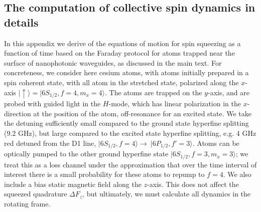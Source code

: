 \documentclass[preprint,aps,pra,onecolumn,superscriptaddress]{revtex4-1} %
\def\ket#1{\lvert{#1}\rangle}%
\begin{document}


\begin{appendix}
\section{The computation of collective spin dynamics in details}\label{Sec::opticalpumpinginrotatingframe}
In this appendix we derive of the equations of motion for spin squeezing as a function of time based on the Faraday protocol for atoms trapped near the surface of nanophotonic waveguides, as discussed in the main text.  For concreteness, we consider here cesium atoms, with atoms initially prepared in a spin coherent state, with all atom in the stretched state, polarized along the $x$-axis $\ket{\uparrow} = \ket{6S_{1/2}, f=4, m_x=4}$.  The atoms are trapped on the $y$-axis, and are probed with guided light in the $H$-mode, which has linear polarization in the $x$-direction at the position of the atom, off-resonance for an excited state.   We take the detuning sufficiently small compared to the ground state hyperfine splitting (9.2 GHz), but large compared to the excited state hyperfine splitting, e.g. 4 GHz red detuned from the D1 line,  $\ket{6S_{1/2}, f=4}\rightarrow \ \ket{6P_{1/2},f'=3}$.   Atoms can be optically pumped to the other ground hyperfine state $\ket{6S_{1/2}, f=3, m_x=3}$; we treat this as a loss channel under the approximation that over the time interval of interest there is a small probability for these atoms to repump to $f=4$.  We also include a bias static magnetic field along the $z$-axis.  This does not affect the squeezed quadrature $\Delta F_z$, but ultimately, we must  calculate all dynamics in the rotating frame.


\end{appendix}
\end{document}
